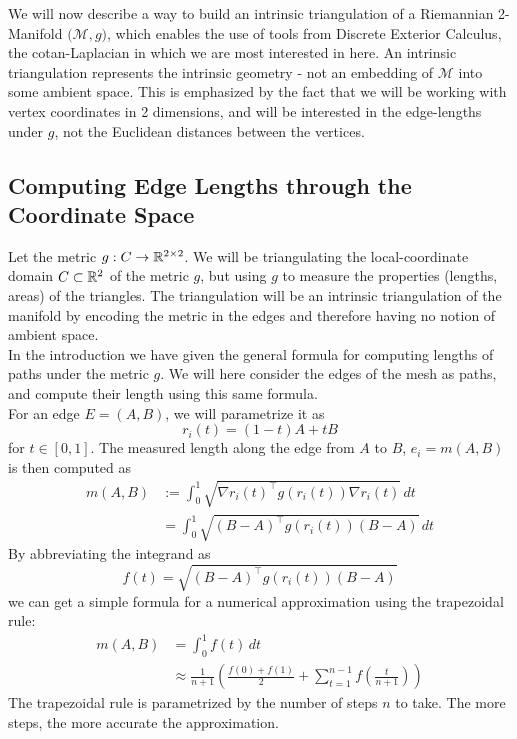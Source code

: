 \ifdefined\COMPILINGFROMMAIN
\else
    
    
\fi
We will now describe a way to build an intrinsic triangulation of a Riemannian 2-Manifold $\big(\mathcal{M}, g\big)$, which enables the use of tools from Discrete Exterior Calculus, the cotan-Laplacian in which we are most interested in here. An intrinsic triangulation represents the intrinsic geometry - not an embedding of $\mathcal{M}$ into some ambient space. This is emphasized by the fact that we will be working with vertex coordinates in 2 dimensions, and will be interested in the edge-lengths under $g$, not the Euclidean distances between the vertices.
\\
\subsection*{Computing Edge Lengths through the Coordinate Space} 
Let the metric $g : C \to \mathbb{R}^{2\times2}$. We will be triangulating the local-coordinate domain $C\subset \mathbb{R}^2$ of the metric $g$, but using $g$ to measure the properties (lengths, areas) of the triangles. The triangulation will be an intrinsic triangulation of the manifold by encoding the metric in the edges and therefore having no notion of ambient space.
\\
In the introduction we have given the general formula for computing lengths of paths under the metric $g$. We will here consider the edges of the mesh as paths, and compute their length using this same formula. 
\\
For an edge $E = (A, B)$, we will parametrize it as $$r_i(t) = (1-t)A + tB$$ for $t\in[0,1]$. The measured length along the edge from $A$ to $B$, $e_i = m(A, B)$ is then computed as
\begin{align*}
    m(A, B) &:= \int_{0}^{1}\! \sqrt{\nabla r_i(t)^\top g(r_i(t)) \nabla r_i(t)} \, dt
    \\ 
    &= \int_{0}^{1}\! \sqrt{(B\!-\!A)^\top g(r_i(t)) (B\!-\!A)} \, dt
\end{align*}
By abbreviating the integrand as $$f(t) = \sqrt{(B\!-\!A)^\top g(r_i(t)) (B\!-\!A)}$$ we can get a simple formula for a numerical approximation using the trapezoidal rule:
\begin{align*}
    m(A, B) &= \int_{0}^{1}\! f(t) \, dt 
    \\
    &\approx \frac{1}{n\!+\!1}\!\left(\frac{f(0)\!+\!f(1)}{2} +  \sum_{t=1}^{n-1} f\!\left(\frac{t}{n\!+\!1}\right)  \right) 
\end{align*}
The trapezoidal rule is parametrized by the number of steps $n$ to take. The more steps, the more accurate the approximation.

